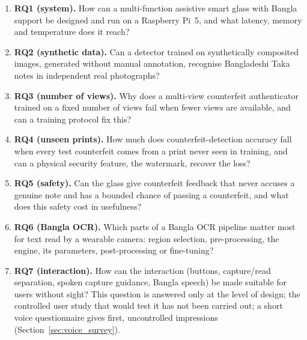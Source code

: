 \begin{enumerate}
    \item \textbf{RQ1 (system).} How can a multi-function assistive smart glass with Bangla support be designed and run on a Raspberry Pi~5, and what latency, memory and temperature does it reach?

    \item \textbf{RQ2 (synthetic data).} Can a detector trained on synthetically composited images, generated without manual annotation, recognise Bangladeshi Taka notes in independent real photographs?

    \item \textbf{RQ3 (number of views).} Why does a multi-view counterfeit authenticator trained on a fixed number of views fail when fewer views are available, and can a training protocol fix this?

    \item \textbf{RQ4 (unseen prints).} How much does counterfeit-detection accuracy fall when every test counterfeit comes from a print never seen in training, and can a physical security feature, the watermark, recover the loss?

    \item \textbf{RQ5 (safety).} Can the glass give counterfeit feedback that never accuses a genuine note and has a bounded chance of passing a counterfeit, and what does this safety cost in usefulness?

    \item \textbf{RQ6 (Bangla OCR).} Which parts of a Bangla OCR pipeline matter most for text read by a wearable camera: region selection, pre-processing, the engine, its parameters, post-processing or fine-tuning?

    \item \textbf{RQ7 (interaction).} How can the interaction (buttons, capture/read separation, spoken capture guidance, Bangla speech) be made suitable for users without sight? This question is answered only at the level of design; the controlled user study that would test it has not been carried out; a short voice questionnaire gives first, uncontrolled impressions (Section~\ref{sec:voice_survey}).
\end{enumerate}

